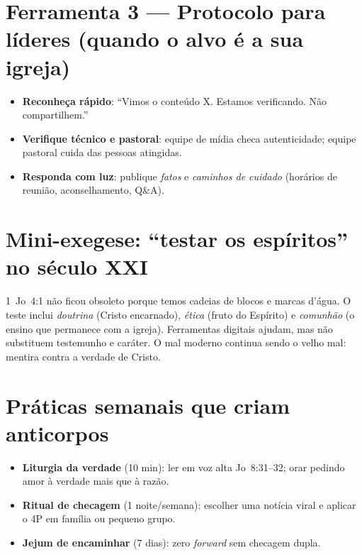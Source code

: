 \section{Ferramenta 3 — Protocolo para líderes (quando o alvo é a sua igreja)}
\begin{checklist}[title={Resposta em 3 passos},breakable]
\begin{itemize}[leftmargin=*,noitemsep]
  \item \textbf{Reconheça rápido}: ``Vimos o conteúdo X. Estamos verificando. Não compartilhem.''
  \item \textbf{Verifique técnico e pastoral}: equipe de mídia checa autenticidade; equipe pastoral cuida das pessoas atingidas.
  \item \textbf{Responda com luz}: publique \emph{fatos} e \emph{caminhos de cuidado} (horários de reunião, aconselhamento, Q\&A).
\end{itemize}
\end{checklist}

\section{Mini-exegese: ``testar os espíritos'' no século XXI}
1~Jo~4:1 não ficou obsoleto porque temos cadeias de blocos e marcas d'água. O teste inclui \emph{doutrina} (Cristo encarnado), \emph{ética} (fruto do Espírito) e \emph{comunhão} (o ensino que permanece com a igreja). Ferramentas digitais ajudam, mas não substituem testemunho e caráter. O mal moderno continua sendo o velho mal: mentira contra a verdade de Cristo.

\section{Práticas semanais que criam anticorpos}
\begin{checklist}
\begin{itemize}[leftmargin=*,noitemsep]
  \item \textbf{Liturgia da verdade} (10 min): ler em voz alta Jo~8:31--32; orar pedindo amor à verdade mais que à razão.
  \item \textbf{Ritual de checagem} (1 noite/semana): escolher uma notícia viral e aplicar o 4P em família ou pequeno grupo.
  \item \textbf{Jejum de encaminhar} (7 dias): zero \emph{forward} sem checagem dupla.
\end{itemize}
\end{checklist}

